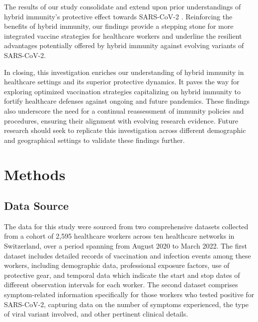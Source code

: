 \documentclass[11pt]{article}
\begin{document}
The results of our study consolidate and extend upon prior understandings of hybrid immunity's protective effect towards SARS-CoV-2 \cite{Boffetta2020DeterminantsOS, Nordstrm2022RiskOS, Goldberg2021ProtectionAW}. Reinforcing the benefits of hybrid immunity, our findings provide a stepping stone for more integrated vaccine strategies for healthcare workers and underline the resilient advantages potentially offered by hybrid immunity against evolving variants of SARS-CoV-2.

In closing, this investigation enriches our understanding of hybrid immunity in healthcare settings and its superior protective dynamics. It paves the way for exploring optimized vaccination strategies capitalizing on hybrid immunity to fortify healthcare defenses against ongoing and future pandemics. These findings also underscore the need for a continual reassessment of immunity policies and procedures, ensuring their alignment with evolving research evidence. Future research should seek to replicate this investigation across different demographic and geographical settings to validate these findings further.

\section*{Methods}

\subsection*{Data Source}
The data for this study were sourced from two comprehensive datasets collected from a cohort of 2,595 healthcare workers across ten healthcare networks in Switzerland, over a period spanning from August 2020 to March 2022. The first dataset includes detailed records of vaccination and infection events among these workers, including demographic data, professional exposure factors, use of protective gear, and temporal data which indicate the start and stop dates of different observation intervals for each worker. The second dataset comprises symptom-related information specifically for those workers who tested positive for SARS-CoV-2, capturing data on the number of symptoms experienced, the type of viral variant involved, and other pertinent clinical details.
\end{document}
